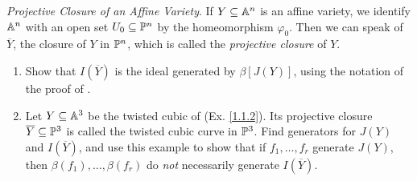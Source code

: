 \label{1.2.9}

\textit{Projective Closure of an Affine Variety}. If $Y \subseteq \A^n$ is an affine variety, we identify $\A^n$ with an open set $U_0 \subseteq \P^n$ by the homeomorphism $\varphi_0$. Then we can speak of $\overline{Y}$, the closure of $Y$ in $\P^n$, which is called the \textit{projective closure} of $Y$.

\begin{enumerate}[label = (\alph*)]
    \item Show that $I(\overline Y)$ is the ideal generated by $\beta[J(Y)]$, using the notation of the proof of \cite[2.2]{hartshorne}.
    
    \item Let $Y \subseteq \A^3$ be the twisted cubic of (Ex. \ref{1.1.2}). Its projective closure $\overline{Y} \subseteq \P^3$ is called the twisted cubic curve in $\P^3$. Find generators for $J(Y)$ and $I(\overline Y)$, and use this example to show that if $f_1, \dots, f_r$ generate $J(Y)$, then $\beta(f_1), \dots, \beta(f_r)$ do \textit{not} necessarily generate $I(\overline{Y})$.
\end{enumerate}

